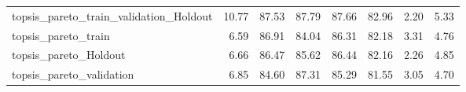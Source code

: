 \begin{table}
\begin{tabular}{lrrrrrrr}
topsis\_pareto\_train\_validation\_Holdout             &       10.77 &    87.53 &      87.79 &   87.66 &  82.96 &             2.20 &         5.33 \\
topsis\_pareto\_train                                &        6.59 &    86.91 &      84.04 &   86.31 &  82.18 &             3.31 &         4.76 \\
topsis\_pareto\_Holdout                              &        6.66 &    86.47 &      85.62 &   86.44 &  82.16 &             2.26 &         4.85 \\
topsis\_pareto\_validation                           &        6.85 &    84.60 &      87.31 &   85.29 &  81.55 &             3.05 &         4.70 \\
\bottomrule
\end{tabular}
\end{table}
